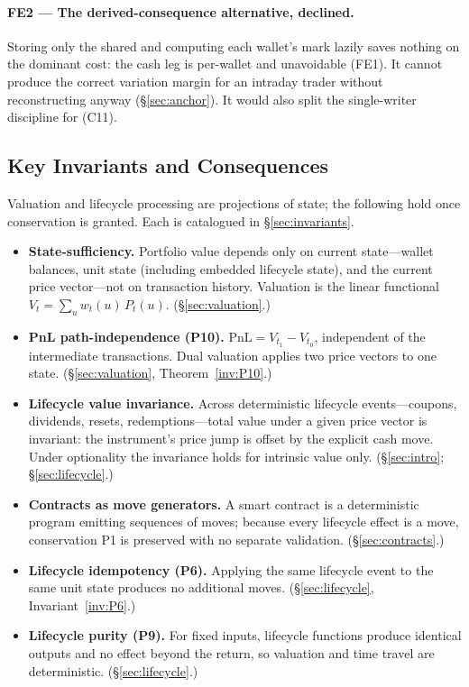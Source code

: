 \paragraph{FE2 --- The derived-consequence alternative, declined.} Storing only the shared
 and computing each wallet's mark lazily saves
nothing on the dominant cost: the cash leg is per-wallet and unavoidable (FE1). It cannot produce the
correct variation margin for an intraday trader without reconstructing \ac{} anyway
(\S\ref{sec:anchor}). It would also split the single-writer discipline for \ac{} (C11).

\subsection*{Key Invariants and Consequences}

Valuation and lifecycle processing are projections of state; the following hold once
conservation is granted. Each is catalogued in \S\ref{sec:invariants}.

\begin{itemize}[nosep]
\item \textbf{State-sufficiency.} Portfolio value depends only on current state---wallet
balances, unit state (including embedded lifecycle state), and the current price
vector---not on transaction history. Valuation is the linear functional
$V_t=\sum_u w_t(u)\,P_t(u)$. (\S\ref{sec:valuation}.)
\item \textbf{PnL path-independence (P10).} $\mathrm{PnL}=V_{t_1}-V_{t_0}$, independent of
the intermediate transactions. Dual valuation applies two price vectors to one state.
(\S\ref{sec:valuation}, Theorem~\ref{inv:P10}.)
\item \textbf{Lifecycle value invariance.} Across deterministic lifecycle
events---coupons, dividends, resets, redemptions---total value under a given price vector
is invariant: the instrument's price jump is offset by the explicit cash move. Under
optionality the invariance holds for intrinsic value only. (\S\ref{sec:intro}; \S\ref{sec:lifecycle}.)
\item \textbf{Contracts as move generators.} A smart contract is a deterministic program
emitting sequences of moves; because every lifecycle effect is a move, conservation P1 is
preserved with no separate validation. (\S\ref{sec:contracts}.)
\item \textbf{Lifecycle idempotency (P6).} Applying the same lifecycle event to the same
unit state produces no additional moves. (\S\ref{sec:lifecycle}, Invariant~\ref{inv:P6}.)
\item \textbf{Lifecycle purity (P9).} For fixed inputs, lifecycle functions produce
identical outputs and no effect beyond the return, so valuation and time travel are
deterministic. (\S\ref{sec:lifecycle}.)
\end{itemize}


